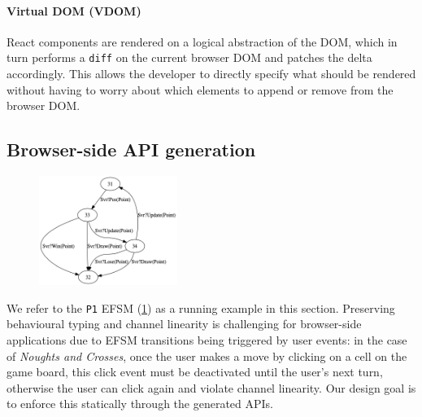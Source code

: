
\paragraph{Virtual DOM (VDOM)}
React components are rendered on a logical
abstraction of the DOM, which in turn performs a \texttt{diff} on the current
browser DOM and patches the delta accordingly.
This allows the developer to
directly specify what should be rendered without having to worry about which
elements to append or remove from the browser DOM.

\subsection{Browser-side API generation}

\label{section:browser}

\begin{figure}
  \begin{center}
    \includegraphics[width=0.4\textwidth]{figures/efsm_p1.png}
  \end{center}

  \label{fig:efsmp1}
\end{figure}

We refer to the \texttt{P1} EFSM (\cref{fig:efsmp1}) as a running example in
this section.
Preserving behavioural typing and channel linearity is challenging
for browser-side applications due to EFSM transitions being triggered by user
events:
in the case of \textit{Noughts and Crosses}, once the user makes a move by
clicking on a cell on the game board, this click event must be deactivated
until the user's next turn, otherwise the user can click again and violate
channel linearity.
Our design goal is to enforce this statically through the generated APIs.

